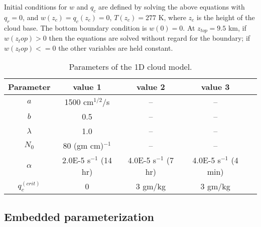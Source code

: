 Initial conditions for $w$ and $q_c$ are defined by solving the above equations with $q_r=0$, and $w(z_c)=q_c(z_c) = 0$, $T(z_c) = 277$ K, where $z_c$ is the height of the cloud base.
The bottom boundary condition is $w(0) = 0$.
At $z_{top} = 9.5$ km, if $w(z_top)>0$ then the equations are solved without regard for the boundary; if $w(z_top)<=0$ the other variables are held constant.

\begin{table}[htbp]
\centering
\caption{Parameters of the 1D cloud model.}
\label{tab:cloud_model_parameters}
\begin{tabular}{ccccc}
  \toprule
  Parameter      &  value 1
                 &  value 2
                 & value 3\\
  \midrule
  $a$ 	 &  1500 cm$^{1/2}$/s  &  --  & -- \\
  $b$    &  0.5                &  --  & --  \\
  $\lambda$  &  1.0            &  --  & --  \\
  $N_0$ &  80 (gm cm)$^{-1}$   &  --  & --  \\
  $\alpha$ & 2.0E-5 s$^{-1}$ (14 hr) & 4.0E-5 s$^{-1}$ (7 hr) & 4.0E-5 s$^{-1}$ (4 min) \\
  $q_c^{(crit)}$ & 0 & 3 gm/kg & 3 gm/kg \\
  \bottomrule
\end{tabular}
\end{table}



\subsection{Embedded parameterization}